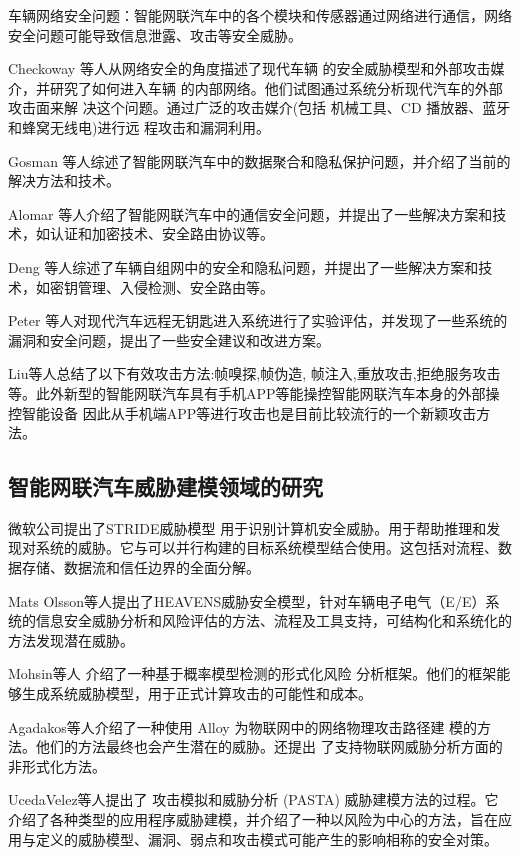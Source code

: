 车辆网络安全问题：智能网联汽车中的各个模块和传感器通过网络进行通信，网络安全问题可能导致信息泄露、攻击等安全威胁。

Checkoway\cite{checkoway2011comprehensive} 等人从网络安全的角度描述了现代车辆
的安全威胁模型和外部攻击媒介，并研究了如何进入车辆
的内部网络。他们试图通过系统分析现代汽车的外部攻击面来解
决这个问题。通过广泛的攻击媒介(包括
机械工具、CD 播放器、蓝牙和蜂窝无线电)进行远
程攻击和漏洞利用。

Gosman\cite{7987438} 等人综述了智能网联汽车中的数据聚合和隐私保护问题，并介绍了当前的解决方法和技术。

Alomar\cite{alomar2017secure} 等人介绍了智能网联汽车中的通信安全问题，并提出了一些解决方案和技术，如认证和加密技术、安全路由协议等。

Deng \cite{deng2014security} 等人综述了车辆自组网中的安全和隐私问题，并提出了一些解决方案和技术，如密钥管理、入侵检测、安全路由等。

Peter \cite{peter2019evaluation} 等人对现代汽车远程无钥匙进入系统进行了实验评估，并发现了一些系统的漏洞和安全问题，提出了一些安全建议和改进方案。

Liu\cite{liu2017vehicle}等人总结了以下有效攻击方法:帧嗅探,帧伪造,
帧注入,重放攻击,拒绝服务攻击等。此外新型的智能网联汽车具有手机APP等能操控智能网联汽车本身的外部操控智能设备
因此从手机端APP等进行攻击也是目前比较流行的一个新颖攻击方法。

\subsection{智能网联汽车威胁建模领域的研究}
微软公司提出了STRIDE威胁模型 \cite{kohnfelder1999threats} 用于识别计算机安全威胁。用于帮助推理和发现对系统的威胁。它与可以并行构建的目标系统模型结合使用。这包括对流程、数据存储、数据流和信任边界的全面分解。

Mats Olsson\cite{lautenbach2021proposing}等人提出了HEAVENS威胁安全模型，针对车辆电子电气（E/E）系统的信息安全威胁分析和风险评估的方法、流程及工具支持，可结构化和系统化的方法发现潜在威胁。

Mohsin等人\cite{mohsin2017iotriskanalyzer} 介绍了一种基于概率模型检测的形式化风险
分析框架。他们的框架能够生成系统威胁模型，用于正式计算攻击的可能性和成本。

Agadakos\cite{agadakos2017jumping}等人介绍了一种使用 Alloy 为物联网中的网络物理攻击路径建
模的方法。他们的方法最终也会产生潜在的威胁。还提出
了支持物联网威胁分析方面的非形式化方法。

UcedaVelez等人提出了\cite{ucedavelez2015risk} 攻击模拟和威胁分析 (PASTA) 威胁建模方法的过程。它介绍了各种类型的应用程序威胁建模，并介绍了一种以风险为中心的方法，旨在应用与定义的威胁模型、漏洞、弱点和攻击模式可能产生的影响相称的安全对策。 

